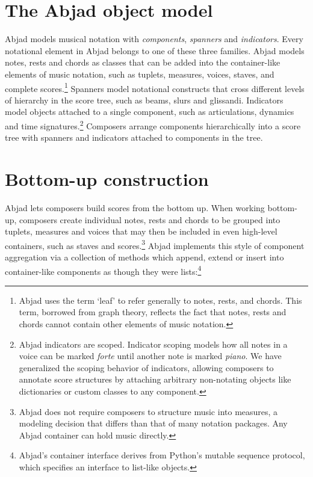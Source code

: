 \documentclass{article}
\begin{document}
\section{The Abjad object model} \label{sec:object-model}

Abjad models musical notation with \emph{components}, \emph{spanners} and
\emph{indicators}. Every notational element in Abjad belongs to one of these
three families. Abjad models notes, rests
and chords as classes that can be added into the container-like elements of music notation,
such as tuplets, measures, voices, staves, and complete scores.\footnote{Abjad
uses the term `leaf' to refer generally to notes, rests, and chords. This term,
borrowed from graph theory, reflects the fact that notes, rests and chords
cannot contain other elements of music notation.} Spanners model notational constructs
that cross different levels of hierarchy in the score tree, such as beams,
slurs and glissandi. Indicators model objects attached to a single
component, such as articulations, dynamics and time signatures.\footnote{Abjad indicators are scoped. Indicator scoping models how all notes in a voice can be marked
\emph{forte} until another note is marked \emph{piano}. We have generalized
the scoping behavior of indicators, allowing composers to annotate score
structures by attaching arbitrary non-notating objects like dictionaries or
custom classes to any component.} Composers arrange
components hierarchically into a score tree with spanners and indicators attached to components in the tree.

\section{Bottom-up construction} \label{sec:bottom-up}

Abjad lets composers build scores from the bottom up. When working bottom-up,
composers create individual notes, rests and chords to be grouped
into tuplets, measures and voices that may then be
included in even high-level containers, such as staves and scores.\footnote{Abjad does not require composers to structure music into measures, a modeling decision that differs than that of many notation packages. Any Abjad container can hold music directly.} Abjad implements this style of
component aggregation via a collection of methods which append, extend or
insert into container-like components as though they were
lists:\footnote{Abjad's container interface derives from Python's mutable
sequence protocol, which specifies an interface to list-like objects.}
\end{document}

